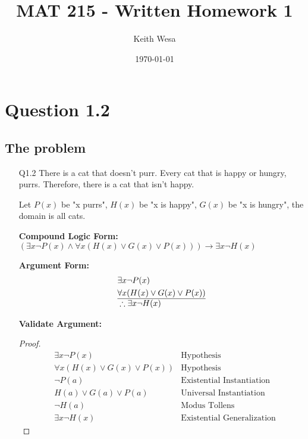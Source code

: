 \documentclass{article}
\author{Keith Wesa}
\title{MAT 215 - Written Homework 1}
\date{\today}
\begin{document}
\section*{Question 1.2}
\subsection*{The problem}
\begin{itemize}
    \item[Q1.2] There is a cat that doesn't purr. Every cat that is happy or hungry, purrs. 
    Therefore, there is a cat that isn't happy.
    \item[] Let $P(x)$ be "x purrs", $H(x)$ be "x is happy", $G(x)$ be "x is hungry", the domain is all cats.
    \item[] \textbf{Compound Logic Form: } $(\exists x \neg P(x) \land \forall x (H(x) \lor G(x) \lor P(x))) \rightarrow \exists x \neg H(x)$
    \item[] \textbf{Argument Form:}
    \begin{equation*}
        \begin{aligned}
            & \exists x \neg P(x) \\
            & \forall x (H(x) \lor G(x) \lor P(x)) \\
             \hline
            &\therefore \exists x \neg H(x)
        \end{aligned}
    \end{equation*}
    \item[] \textbf{Validate Argument: }
    \begin{proof}
        \begin{align*}
            & \exists x \neg P(x) & \text{Hypothesis} \\
            & \forall x (H(x) \lor G(x) \lor P(x)) & \text{Hypothesis} \\
            & \neg P(a) & \text{Existential Instantiation} \\
            & H(a) \lor G(a) \lor P(a) & \text{Universal Instantiation} \\
            & \neg H(a) & \text{Modus Tollens} \\
            & \boxed{\exists x \neg H(x)} & \text{Existential Generalization}
        \end{align*}
    \end{proof}
\end{itemize}
\end{document}
